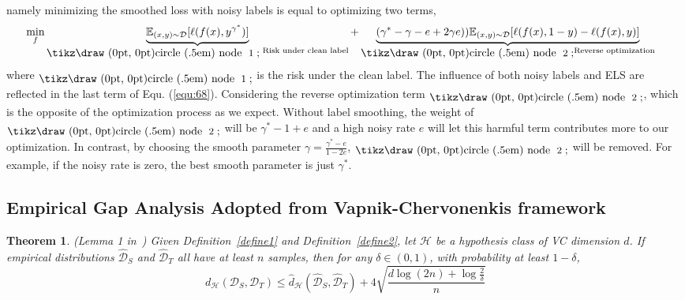 \documentclass{article} \usepackage{iclr2023_conference,times}
\newtheorem{theo}{Theorem}
\newcommand{\ls}[0]{ELS\xspace}
\newcommand{\myref}[1]{Equ. (\ref{#1})}
\newcommand{\D}{\mathcal{D}}
\newcommand*{\circled}[1]{\lower.7ex\hbox{\tikz\draw (0pt, 0pt)circle (.5em) node {\makebox[1em][c]{\small #1}};}}
\begin{document}
namely minimizing the smoothed loss with noisy labels is equal to optimizing two terms, 
\begin{equation}
\begin{aligned}
&\min_{f}\underbrace{\mathbb{E}_{(x,y)\sim\mathcal{D}}[\ell(f(x),y^{\gamma^*})]}_{\rm \circled{\rm 1}\text{ Risk under clean label}}+\underbrace{(\gamma^*-\gamma-e+2\gamma e))\mathbb{E}_{(x,y)\sim\mathcal{D}}[\ell(f(x),1-y)-\ell(f(x),y)]}_{\rm \circled{\rm 2} \text{Reverse optimization}}
\end{aligned}
\label{equ:68}
\end{equation}
where $\rm \circled{\rm 1}$ is the risk under the clean label. The influence of both noisy labels and \ls are reflected in the last term of \myref{equ:68}. Considering the reverse optimization term $\rm \circled{\rm 2}$, which is the opposite of the optimization process as we expect. Without label smoothing, the weight of $\rm \circled{\rm 2}$ will be $\gamma^*-1+e$ and a high noisy rate $e$ will let this harmful term contributes more to our optimization. In contrast, by choosing the smooth parameter $\gamma=\frac{\gamma^*-e}{1-2e}$, $\rm \circled{\rm 2}$ will be removed. For example, if the noisy rate is zero, the best smooth parameter is just $\gamma^*$.

\subsection{Empirical Gap Analysis Adopted from Vapnik-Chervonenkis framework}\label{sec:empirical_vc}
\begin{theo}
(Lemma 1 in~\citep{ben2010theory}) Given Definition~\ref{define1} and Definition~\ref{define2}, let $\mathcal{H}$ be a hypothesis class of VC dimension $d$. If empirical distributions $\hat{\D}_S$ and $\hat{\D}_T$ all have at least $n$ samples, then for any $\delta\in(0,1)$, with probability at least $1-\delta$,
\begin{equation}
   d_{\mathcal{H}}(\D_S,\D_T) \leq \hat{d}_{\mathcal{H}}(\hat{\D}_S,\hat{\D}_T)+4\sqrt{\frac{d\log(2n)+\log\frac{2}{\delta}}{n}}\end{equation}
\label{theo:empirical_dann}
\end{theo}
\end{document}
